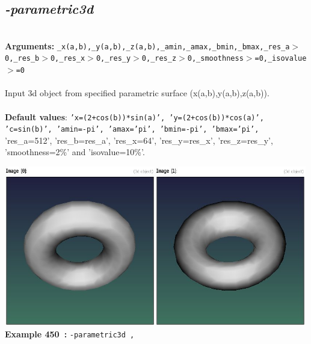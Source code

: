 \documentclass[a4paper,11pt,twoside]{book}
\begin{document}
\subsection{\emph{-parametric3d} }\vspace*{-0.5em}
~\\\textbf{Arguments: } 
{\small \texttt{\_x(a,b),\_y(a,b),\_z(a,b),\_amin,\_amax,\_bmin,\_bmax,\_res\_a$>$0,\_res\_b$>$0,\_res\_x$>$0,\_res\_y$>$0,\_res\_z$>$0,\_smoothness$>$=0,\_isovalue$>$=0}}\\~\\
Input 3d object from specified parametric surface (x(a,b),y(a,b),z(a,b)).
~\\~\\\textbf{Default values}: {\small \texttt{'x=(2+cos(b))*sin(a)', 'y=(2+cos(b))*cos(a)', 'c=sin(b)', 'amin=-pi', 'amax='pi', 'bmin=-pi', 'bmax='pi',}}
~\\'res\_a=512', 'res\_b=res\_a', 'res\_x=64', 'res\_y=res\_x', 'res\_z=res\_y', 'smoothness=2\%' and 'isovalue=10\%'.
\begin{center}\includegraphics[keepaspectratio=true,height=7cm,width=\textwidth]{img/gmic_def450.jpg}\\
{\footnotesize \textbf{Example 450~:} \texttt{-parametric3d ,}}
\end{center}
\end{document}
